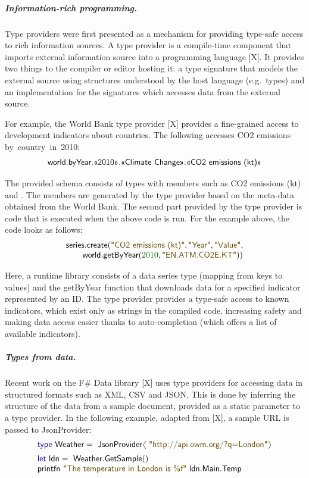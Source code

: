 \documentclass[a4paper,UKenglish]{lipics-v2016}
\theoremstyle{plain}
\theoremstyle{definition}
\newcommand{\langl}{\begin{picture}(4.5,7)
\put(1.1,2.5){\rotatebox{60}{\line(1,0){5.5}}}
\put(1.1,2.5){\rotatebox{300}{\line(1,0){5.5}}}
\end{picture}}
\newcommand{\rangl}{\begin{picture}(4.5,7)
\put(.9,2.5){\rotatebox{120}{\line(1,0){5.5}}}
\put(.9,2.5){\rotatebox{240}{\line(1,0){5.5}}}
\end{picture}}
\newcommand{\num}[1]{\textcolor{numclr}{#1}}
\newcommand{\str}[1]{\textnormal{\textcolor{strclr}{\sffamily "#1"}}}
\newcommand{\kvd}[1]{\textnormal{\textcolor{kvdclr}{\sffamily #1}}}
\newcommand{\ident}[1]{\textnormal{\sffamily #1}}
\newcommand{\qident}[1]{\textnormal{\sffamily \guillemotleft #1\guillemotright}}
\begin{document}
\subparagraph{Information-rich programming.} Type providers were first presented as a mechanism
for providing type-safe access to rich information sources. A type provider is a compile-time 
component that imports external information source into a programming language [X]. It provides two 
things to the compiler or editor hosting it: a type signature that models the external source 
using structures understood by the host language (e.g.~types) and an implementation for the 
signatures which accesses data from the external source.

For example, the World Bank type provider [X] provides a fine-grained access to development 
indicators about countries. The following accesses CO2 emissions by~country~in~2010:
%
\begin{equation*}
\begin{array}{l}
\ident{world}.\ident{byYear}.\qident{2010}.\qident{Climate Change}.\qident{CO2 emissions (kt)}
\end{array}
\end{equation*}

\noindent
The provided schema consists of types with members such as \qident{CO2 emissions (kt)} and \qident{2010}.
The members are generated by the type provider based on the meta-data obtained from the World Bank.
The second part provided by the type provider is code that is executed when the above code is run.
For the example above, the code looks as follows:
%
\begin{equation*}
\begin{array}{l}
\ident{series.create}(\str{CO2 emissions (kt)},\str{Year},\str{Value},\\
\qquad \ident{world.getByYear}(\num{2010},\str{EN.ATM.CO2E.KT}))
\end{array}
\end{equation*}

\noindent
Here, a runtime library consists of a data series type (mapping from keys to values) and the 
\ident{getByYear} function that downloads data for a specified indicator represented by an ID. 
The type provider provides a type-safe access to known indicators, which exist only as strings in 
the compiled code, increasing safety and making data access easier thanks to auto-completion 
(which offers a list of available indicators).

\subparagraph{Types from data.} Recent work on the F\# Data library [X] uses type providers for 
accessing data in structured formats such as XML, CSV and JSON. This is done by inferring the 
structure of the data from a sample document, provided as a static parameter to a type provider.
In the following example, adapted from [X], a sample URL is passed to \ident{JsonProvider}:
%
\begin{equation*}
\begin{array}{l}
 \kvd{type}~\ident{Weather} = \ident{JsonProvider}\langl\str{http://api.owm.org/?q=London}\rangl \\[0.5em]
 \kvd{let}~\ident{ldn} = \ident{Weather.GetSample}()\\
 \ident{printfn}~\str{The temperature in London is \%f}~\ident{ldn.Main.Temp}
\end{array}
\end{equation*}
\end{document}

